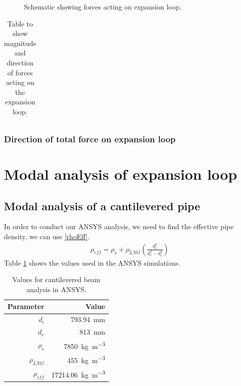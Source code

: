\begin{figure}[H]
    \centering
    \caption{Schematic showing forces acting on expansion loop.}
\end{figure}

\begin{table}[H]
    \centering
    \begin{tabular}{@{}llll@{}}
        
    \end{tabular}
    \caption{Table to show magnitude and direction of forces acting on the expansion loop.}
\end{table}

\subsubsection{Direction of total force on expansion loop}
\section{Modal analysis of expansion loop}
\subsection{Modal analysis of a cantilevered pipe}
In order to conduct our ANSYS analysis, we need to find the effective pipe density, we can use \eqref{rhoEff}.
\begin{gather}\label{rhoEff}
    \rho_{eff} = \rho_s + \rho_{LNG}\left(\frac{d_i^2}{d_e^2 - d_i^2}\right)
\end{gather}
Table \ref{modalParams} shows the values used in the ANSYS simulations.
\begin{table}[H]
    \centering
    \begin{tabular}{@{}rr@{}}
        \toprule
        \textbf{Parameter} & \textbf{Value}                            \\
        \midrule
        $d_i$              & \SI{793.94}{\milli\meter}                 \\
        $d_e$              & \SI{813}{\milli\meter}                    \\
        $\rho_s$           & \SI{7850}{\kilo\gram\per\meter\cubed}     \\
        $\rho_{LNG}$       & \SI{455}{\kilo\gram\per\meter\cubed}      \\
        $\rho_{eff}$       & \SI{17214.06}{\kilo\gram\per\meter\cubed} \\
        \bottomrule
    \end{tabular}
    \caption{Values for cantilevered beam analysis in ANSYS.}
    \label{modalParams}
\end{table}

